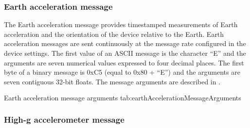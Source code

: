 \subsubsection{Earth acceleration message}

The Earth acceleration message provides timestamped measurements of Earth acceleration and the orientation of the device relative to the Earth.  Earth acceleration messages are sent continuously at the message rate configured in the device settings.  The first value of an \ac{ASCII} message is the character \enquote{E} and the arguments are seven numerical values expressed to four decimal places.  The first byte of a binary message is 0xC5 (equal to 0x80 + \enquote{E}) and the arguments are seven contiguous 32-bit floats.  The message arguments are described in .

\begingroup
    \def\tempArgumentA{Quaternion W element}
    \def\tempArgumentB{Quaternion X element}
    \def\tempArgumentC{Quaternion Y element}
    \def\tempArgumentD{Quaternion Z element}
    \def\tempArgumentE{Earth acceleration X axis in g}
    \def\tempArgumentF{Earth acceleration Y axis in g}
    \def\tempArgumentG{Earth acceleration Z axis in g}
    \def\tempCaption{Earth acceleration message arguments}
    \def\tempLabel{tab:earthAccelerationMessageArguments}
    \dataMessageTable
    {Earth acceleration message arguments}
    {tab:earthAccelerationMessageArguments}
\endgroup

\begingroup
    \def\tempNameA{Quaternion W element}
    \def\tempNameB{Quaternion X element}
    \def\tempNameC{Quaternion Y element}
    \def\tempNameD{Quaternion Z element}
    \def\tempNameE{Earth acceleration X axis}
    \def\tempNameF{Earth acceleration Y axis}
    \def\tempNameG{Earth acceleration Z axis}
    \def\tempValueA{1}
    \def\tempValueB{0}
    \def\tempValueC{0}
    \def\tempValueD{0}
    \def\tempValueE{0}
    \def\tempValueF{0}
    \def\tempValueG{0}
    \def\tempAsciiFirst{E}
    \def\tempAsciiA{1.0000}
    \def\tempAsciiB{0.0000}
    \def\tempAsciiC{0.0000}
    \def\tempAsciiD{0.0000}
    \def\tempAsciiE{0.0000}
    \def\tempAsciiF{0.0000}
    \def\tempAsciiG{0.0000}
    \def\tempBinaryFirst{C5}
    \def\tempBinaryA{00 00 80 3F}
    \def\tempBinaryB{00 00 00 00}
    \def\tempBinaryC{00 00 00 00}
    \def\tempBinaryD{00 00 00 00}
    \def\tempBinaryE{00 00 00 00}
    \def\tempBinaryF{00 00 00 00}
    \def\tempBinaryG{00 00 00 00}
    \dataMessageExample
\endgroup

\subsubsection{High-g accelerometer message}

